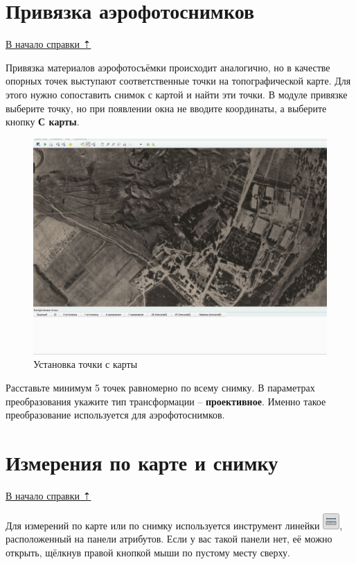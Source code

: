 \documentclass[
  12pt,
]{book}
\begin{document}
\section{Привязка аэрофотоснимков}\label{georeference-aerial}

\hyperref[georeference]{В начало справки ⇡}

Привязка материалов аэрофотосъёмки происходит аналогично, но в качестве опорных точек выступают соответственные точки на топографической карте. Для этого нужно сопоставить снимок с картой и найти эти точки. В модуле привязке выберите точку, но при появлении окна не вводите координаты, а выберите кнопку \textbf{С карты}.

\begin{figure}
\centering
\includegraphics{images/Georeference/Reference_aerial.gif}
\caption{Установка точки с карты}
\end{figure}

Расставьте минимум 5 точек равномерно по всему снимку. В параметрах преобразования укажите тип трансформации -- \textbf{проективное}. Именно такое преобразование используется для аэрофотоснимков.

\section{Измерения по карте и снимку}\label{georeference-measure}

\hyperref[georeference]{В начало справки ⇡}

Для измерений по карте или по снимку используется инструмент линейки \includegraphics{images/Georeference/Measure.png}, расположенный на панели атрибутов. Если у вас такой панели нет, её можно открыть, щёлкнув правой кнопкой мыши по пустому месту сверху.
\end{document}
